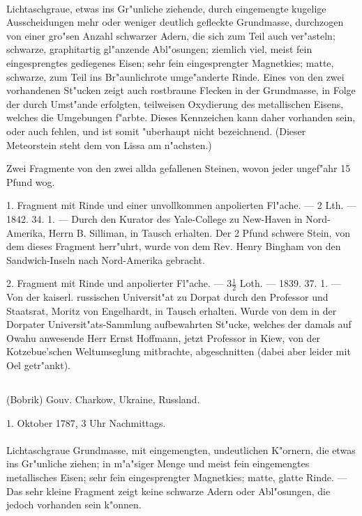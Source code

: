 \documentclass[a4paper, 11pt, oneside, polutonikogreek, german]{article}
\begin{document}
\paragraph{}
Lichtaschgraue, etwas ins Gr"unliche ziehende, durch eingemengte kugelige Ausscheidungen mehr oder weniger deutlich gefleckte Grundmasse, durchzogen von einer gro"sen Anzahl schwarzer Adern, die sich zum Teil auch ver"asteln; schwarze, graphitartig gl"anzende Abl"osungen; ziemlich viel, meist fein eingesprengtes gediegenes Eisen; sehr fein eingesprengter Magnetkies; matte, schwarze, zum Teil ins Br"aunlichrote umge"anderte Rinde. Eines von den zwei vorhandenen St"ucken zeigt auch rostbraune Flecken in der Grundmasse, in Folge der durch Umst"ande erfolgten, teilweisen Oxydierung des metallischen Eisens, welches die Umgebungen f"arbte. Dieses Kennzeichen kann daher vorhanden sein, oder auch fehlen, und ist somit "uberhaupt nicht bezeichnend. (Dieser Meteorstein steht dem von Lissa am n"achsten.)

Zwei Fragmente von den zwei allda gefallenen Steinen, wovon jeder ungef"ahr 15 Pfund wog.

1. Fragment mit Rinde und einer unvollkommen anpolierten Fl"ache. --- 2 Lth. --- 1842. 34. 1. --- Durch den Kurator des Yale-College zu New-Haven in Nord-Amerika, Herrn B. Silliman, in Tausch erhalten. Der 2 Pfund schwere Stein, von dem dieses Fragment herr"uhrt, wurde von dem Rev. Henry Bingham von den Sandwich-Inseln nach Nord-Amerika gebracht.

2. Fragment mit Rinde und anpolierter Fl"ache. --- $\mathfrak{3\frac{1}{2}}$ Loth. --- 1839. 37. 1. --- Von der kaiserl. russischen Universit"at zu Dorpat durch den Professor und Staatsrat, Moritz von Engelhardt, in Tausch erhalten. Wurde von dem in der Dorpater Universit"ats-Sammlung aufbewahrten St"ucke, welches der damals auf Owahu anwesende Herr Ernst Hoffmann, jetzt Professor in Kiew, von der Kotzebue'schen Weltumseglung mitbrachte, abgeschnitten (dabei aber leider mit Oel getr"ankt).
\subsection{}
\begin{center}

(Bobrik) Gouv. Charkow, Ukraine, Russland.

1. Oktober 1787, 3 Uhr Nachmittags.
\end{center}
\paragraph{}
Lichtaschgraue Grundmasse, mit eingemengten, undeutlichen K"ornern, die etwas ins Gr"unliche ziehen; in m"a"siger Menge und meist fein eingemengtes metallisches Eisen; sehr fein eingesprengter Magnetkies; matte, glatte Rinde. --- Das sehr kleine Fragment zeigt keine schwarze Adern oder Abl"osungen, die jedoch vorhanden sein k"onnen.
\end{document}
